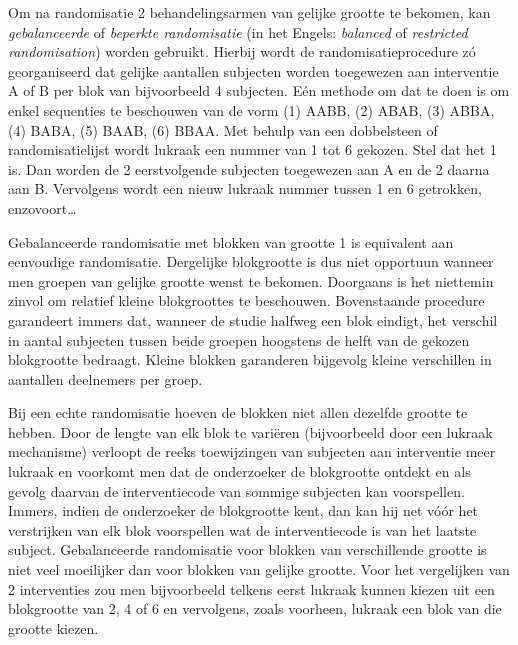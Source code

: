\documentclass[
  12pt,dutch,coursenotes]{book}
\theoremstyle{definition}
\theoremstyle{definition}
\theoremstyle{definition}
\theoremstyle{definition}
\theoremstyle{remark}
\begin{document}
Om na randomisatie 2 behandelingsarmen van gelijke grootte te bekomen, kan
\emph{gebalanceerde} of \emph{beperkte randomisatie} (in het Engels:
\emph{balanced} of \emph{restricted randomisation}) worden gebruikt.
Hierbij wordt de randomisatieprocedure zó georganiseerd dat gelijke
aantallen subjecten worden toegewezen aan interventie A of B per blok van
bijvoorbeeld 4 subjecten. Eén methode om dat te doen is om enkel
sequenties te beschouwen van de vorm (1) AABB, (2) ABAB, (3) ABBA, (4) BABA,
(5) BAAB, (6) BBAA. Met behulp van een dobbelsteen of randomisatielijst
wordt lukraak een nummer van 1 tot 6 gekozen. Stel dat het 1 is. Dan worden
de 2 eerstvolgende subjecten toegewezen aan A en de 2 daarna aan B.
Vervolgens wordt een nieuw lukraak nummer tussen 1 en 6 getrokken,
enzovoort\ldots{}

Gebalanceerde randomisatie met blokken van grootte 1 is equivalent aan
eenvoudige randomisatie. Dergelijke blokgrootte is dus niet opportuun
wanneer men groepen van gelijke grootte wenst te bekomen.
Doorgaans is het niettemin zinvol om relatief kleine blokgroottes te
beschouwen. Bovenstaande procedure garandeert immers dat, wanneer de studie
halfweg een blok eindigt, het verschil in aantal subjecten tussen beide
groepen hoogstens de helft van de gekozen blokgrootte bedraagt.
Kleine blokken garanderen bijgevolg kleine verschillen in aantallen deelnemers per groep.

Bij een echte randomisatie hoeven de blokken niet allen dezelfde grootte te
hebben. Door de lengte van elk blok te variëren (bijvoorbeeld door een
lukraak mechanisme) verloopt de reeks toewijzingen van subjecten aan
interventie meer lukraak en voorkomt men dat de onderzoeker de blokgrootte ontdekt
en als gevolg daarvan de interventiecode van sommige subjecten kan
voorspellen. Immers, indien de onderzoeker de blokgrootte kent, dan kan hij net vóór het verstrijken van elk blok voorspellen wat de interventiecode
is van het laatste subject. Gebalanceerde randomisatie voor blokken
van verschillende grootte is niet veel moeilijker dan voor blokken van
gelijke grootte. Voor het vergelijken van 2 interventies zou men
bijvoorbeeld telkens eerst lukraak kunnen kiezen uit een blokgrootte van 2,
4 of 6 en vervolgens, zoals voorheen, lukraak een blok van die grootte
kiezen.
\end{document}
